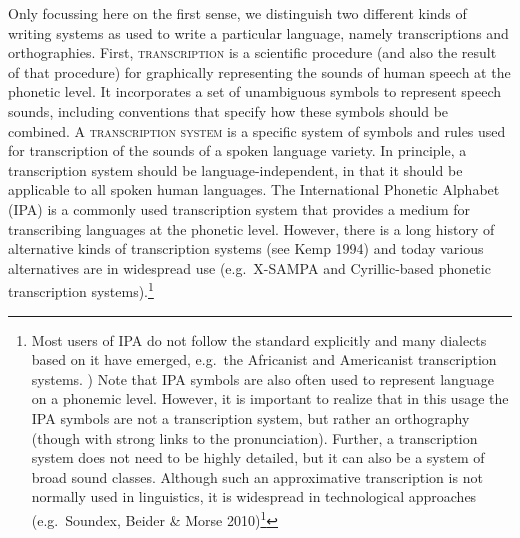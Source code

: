 {{{{{{Only focussing here on the first sense, we distinguish two different kinds of writing systems as used to write a particular language, namely transcriptions and orthographies. First, \textsc{transcription} is a scientific procedure (and also the result of that procedure) for graphically representing the sounds of human speech at the phonetic level. It incorporates a set of unambiguous symbols to represent speech sounds, including conventions that specify how these symbols should be combined. A \textsc{transcription system} is a specific system of symbols and rules used for transcription of the sounds of a spoken language variety. In principle, a transcription system should be language-independent, in that it should be applicable to all spoken human languages. The International Phonetic Alphabet (IPA) is a commonly used transcription system that provides a medium for transcribing languages at the phonetic level. However, there is a long history of alternative kinds of transcription systems (see Kemp 1994) and today various alternatives are in widespread use (e.g.~X-SAMPA and Cyrillic-based phonetic transcription systems).\footnote{Most users of IPA do not follow the standard explicitly and many dialects based on it have emerged, e.g.~the Africanist and Americanist transcription systems. ) Note that IPA symbols are also often used to represent language on a phonemic level. However, it is important to realize that in this usage the IPA symbols are not a transcription system, but rather an orthography (though with strong links to the pronunciation). Further, a transcription system does not need to be highly detailed, but it can also be a system of broad sound classes. Although such an approximative transcription is not normally used in linguistics, it is widespread in technological approaches (e.g.~Soundex, Beider \& Morse 2010)\footnote{http://stevemorse.org/phonetics/bmpm.htm , http://stevemorse.org/phonetics/bmpm2.htm) and it is sometimes fruitfully used in automatic approaches to historical linguistics (Dolgopolsky 1986, ASJP\footnote{http://asjp.clld.org/)).

}}}}}}}}}

